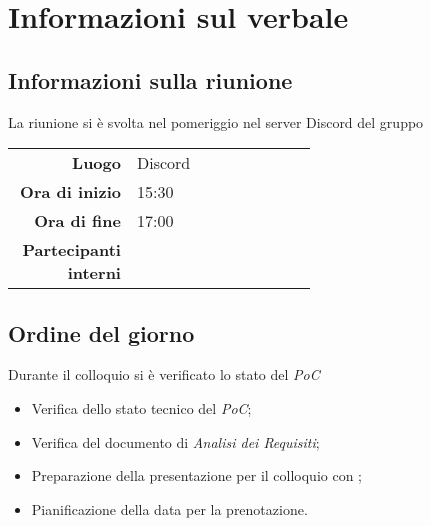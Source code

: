 \section{Informazioni sul verbale}

\subsection{Informazioni sulla riunione}
La riunione si è svolta nel pomeriggio nel server Discord del gruppo

\begin{center}
	\begin{tabular}{r|p{0.6\linewidth}}
		\toprule
		\textbf{Luogo} & Discord \\
		\textbf{Ora di inizio} & 15:30 \\
		\textbf{Ora di fine} & 17:00 \\
		\textbf{Partecipanti interni} & \groupTeam
	\end{tabular}
\end{center}

\medskip

\subsection{Ordine del giorno}
Durante il colloquio si è verificato lo stato del \textit{PoC}
\begin{itemize}
	\item Verifica dello stato tecnico del \textit{PoC};
	\item Verifica del documento di \textit{Analisi dei Requisiti};
	\item Preparazione della presentazione per il colloquio con \Cardin;
	\item Pianificazione della data per la prenotazione.
\end{itemize}